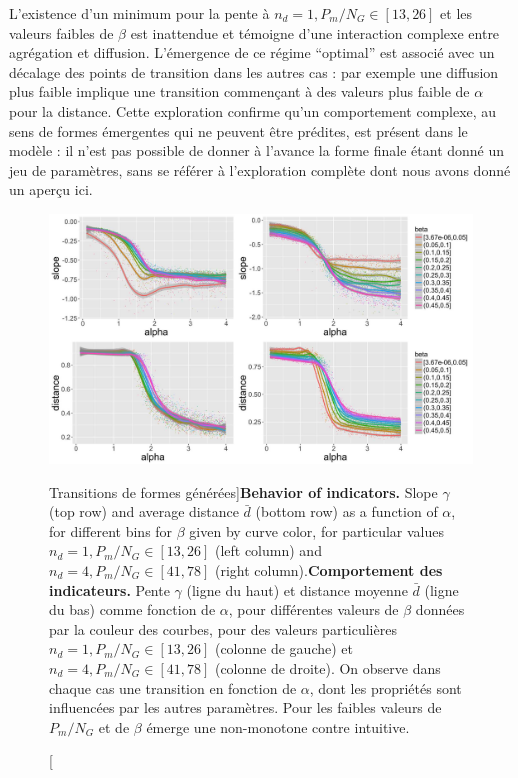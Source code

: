 {L'existence d'un minimum pour la pente à $n_d=1,P_m/N_G\in\left[13,26\right]$ et les valeurs faibles de $\beta$ est inattendue et témoigne d'une interaction complexe entre agrégation et diffusion. L'émergence de ce régime ``optimal'' est associé avec un décalage des points de transition dans les autres cas : par exemple une diffusion plus faible implique une transition commençant à des valeurs plus faible de $\alpha$ pour la distance. Cette exploration confirme qu'un comportement complexe, au sens de formes émergentes qui ne peuvent être prédites, est présent dans le modèle : il n'est pas possible de donner à l'avance la forme finale étant donné un jeu de paramètres, sans se référer à l'exploration complète dont nous avons donné un aperçu ici.
}



\begin{figure}
\includegraphics[width=\linewidth]{Figures/Final/5-2-2-fig-density-fig3}
\caption[Behavior of indicators][Transitions de formes générées]{\textbf{Behavior of indicators.} Slope $\gamma$ (top row) and average distance $\bar{d}$ (bottom row) as a function of $\alpha$, for different bins for $\beta$ given by curve color, for particular values $n_d=1,P_m/N_G\in\left[13,26\right]$ (left column) and $n_d=4,P_m/N_G\in\left[41,78\right]$ (right column).\label{fig:density:fig3}}{\textbf{Comportement des indicateurs.} Pente $\gamma$ (ligne du haut) et distance moyenne $\bar{d}$ (ligne du bas) comme fonction de $\alpha$, pour différentes valeurs de $\beta$ données par la couleur des courbes, pour des valeurs particulières $n_d=1,P_m/N_G\in\left[13,26\right]$ (colonne de gauche) et $n_d=4,P_m/N_G\in\left[41,78\right]$ (colonne de droite). On observe dans chaque cas une transition en fonction de $\alpha$, dont les propriétés sont influencées par les autres paramètres. Pour les faibles valeurs de $P_m/N_G$ et de $\beta$ émerge une non-monotone contre intuitive.\label{fig:density:fig3}}
\end{figure}






